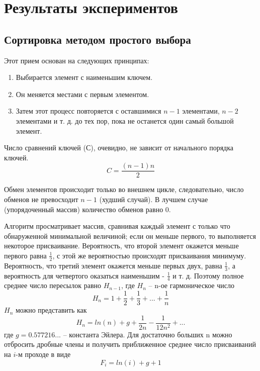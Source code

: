 \documentclass[a4paper,12pt,titlepage,finall]{article}
\begin{document}
\newpage

\section{Результаты экспериментов}
\subsection{Сортировка методом простого выбора} 

Этот прием основан на следующих принципах:
\begin{enumerate} 
  \item Выбирается элемент с наименьшим ключем.
  \item Он меняется местами с первым элементом.
  \item Затем этот процесс повторяется с оставшимися ${n-1}$ элементами, ${n-2}$ элементами и т. д. до тех пор, пока не останется один самый большой элемент.
\end{enumerate}\par
  Число сравнений ключей (С), очевидно, не зависит от начального порядка ключей.
$$C = {\frac{(n-1)n}{2}}$$\par
Обмен элементов происходит только во внешнем цикле, следовательно, число обменов не превосходит ${n-1}$ (худший случай). В лучшем случае (упорядоченный массив) количество обменов равно 0.\par
  Алгоритм просматривает массив, сравнивая каждый элемент с только что обнаруженной минимальной величиной; если он меньше первого, то выполняется некоторое присваивание. Вероятность, что второй элемент окажется меньше первого равна ${\frac{1}{2}}$, с этой же вероятностью происходят присваивания минимуму. Вероятность, что третий элемент окажется меньше первых двух, равна ${\frac{1}{3}}$, а вероятность для четвертого оказаться наименьшим - ${\frac{1}{4}}$ и т. д. Поэтому полное среднее число пересылок равно $H_{n - 1}$, где $H_n$ – n-ое гармоническое число
\begin{equation}
H_{n} = 1 + {\frac{1}{2}} + {\frac{1}{3}} + ... + {\frac{1}{n}}
\end{equation}
$H_n$ можно представить как
\begin{equation}
H_{n} = ln(n) + g + {\frac{1}{2n}} - {\frac{1}{12n^2}} + ...
\end{equation}
где $g = 0.577216...$ – константа Эйлера. Для достаточно больших n можно отбросить дробные члены и получить приближенное среднее число присваиваний на ${i}$-м проходе в виде
\begin{equation}
F_{i} = ln(i) + g + 1
\end{equation}
\end{document}
